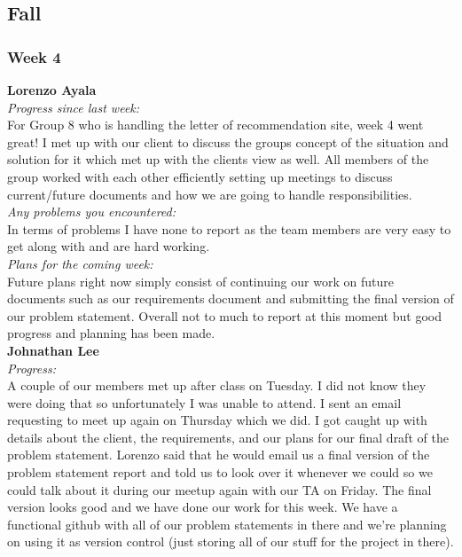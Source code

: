 \subsection{Fall}
\subsubsection{Week 4}

\textbf{Lorenzo Ayala}\\
\noindent\textit{Progress since last week:}\\
For Group 8 who is handling the letter of recommendation site, week 4 went great! I met up with our client to discuss the groups concept of the situation and solution for it which met up with the clients view as well. All members of the group worked with each other efficiently setting up meetings to discuss current/future documents and how we are going to handle responsibilities.\\

\noindent\textit{Any problems you encountered:}\\
\noindent In terms of problems I have none to report as the team members are very easy to get along with and are hard working.\\

\noindent\textit{Plans for the coming week:}\\
\noindent Future plans right now simply consist of continuing our work on future documents such as our requirements document and submitting the final version of our problem statement. Overall not to much to report at this moment but good progress and planning has been made.\\

\noindent\textbf{Johnathan Lee}\\
\noindent\textit{Progress:}\\
A couple of our members met up after class on Tuesday. I did not know they were doing that so unfortunately I was unable to attend. I sent an email requesting to meet up again on Thursday which we did. I got caught up with details about the client, the requirements, and our plans for our final draft of the problem statement. Lorenzo said that he would email us a final version of the problem statement report and told us to look over it whenever we could so we could talk about it during our meetup again with our TA on Friday. The final version looks good and we have done our work for this week. We have a functional github with all of our problem statements in there and we’re planning on using it as version control (just storing all of our stuff for the project in there).\\

